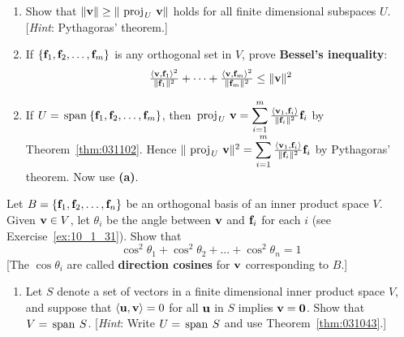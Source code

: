 \begin{multicols}{2}
\begin{ex}
\begin{enumerate}[label={\alph*.}]
\item Show that $\|\textbf{v}\| \geq \|\thinspace\operatorname{proj\medspace}_{\!U}\,{\textbf{v}}\|$ holds for all finite dimensional subspaces $U$. [\textit{Hint}: Pythagoras' theorem.]

\item If $\{\textbf{f}_{1}, \textbf{f}_{2}, \dots, \textbf{f}_{m}\}$ is any orthogonal set in $V$, prove \textbf{Bessel's inequality}:
\begin{equation*}
\tfrac{\langle \textbf{v}, \textbf{f}_1 \rangle ^2}{\| \textbf{f}_1 \| ^2} + \dots +
\tfrac{\langle \textbf{v}, \textbf{f}_m \rangle ^2}{\| \textbf{f}_m \| ^2}
\leq \| \textbf{v} \| ^2
\end{equation*}
\end{enumerate}
\begin{sol}
\begin{enumerate}[label={\alph*.}]
\setcounter{enumi}{1}
\item  If $U = \thinspace\operatorname{span\medspace}\{\textbf{f}_{1}, \textbf{f}_{2}, \dots, \textbf{f}_{m}\}$, then 
$\thinspace\operatorname{proj\medspace}_{\!U}\,{\textbf{v}} = \displaystyle \sum_{i = 1}^{m} \tfrac{\langle \textbf{v}_1, \textbf{f}_i \rangle}{\| \textbf{f}_i \| ^2} \textbf{f}_i$
 by Theorem~\ref{thm:031102}. Hence
$\| \thinspace\operatorname{proj\medspace}_{\!U}\,{\textbf{v}} \| ^2 =
\displaystyle \sum_{i = 1}^{m} \tfrac{\langle \textbf{v}_1, \textbf{f}_i \rangle}{\| \textbf{f}_i \| ^2} \textbf{f}_i$
 by Pythagoras' theorem. Now use \textbf{(a)}.

\end{enumerate}
\end{sol}
\end{ex}

\begin{ex}
Let $B = \{\textbf{f}_{1}, \textbf{f}_{2}, \dots, \textbf{f}_{n}\}$ be an orthogonal basis of an inner product space $V$. Given $\textbf{v} \in V$, let $\theta_{i}$ be the angle between $\textbf{v}$ and $\textbf{f}_{i}$ for each $i$ (see Exercise~\ref{ex:10_1_31}). Show that 
\begin{equation*}
\cos^{2} \theta_{1} + \cos^{2} \theta_{2} + \dots + \cos^{2} \theta_{n} = 1
\end{equation*}
 [The $\cos \theta_{i}$ are called \textbf{direction cosines} for $\textbf{v}$ corresponding to $B$.]
\end{ex}


\columnbreak
\begin{ex}
\begin{enumerate}[label={\alph*.}]
\item Let $S$ denote a set of vectors in a finite dimensional inner product space $V$, and suppose that $\langle\textbf{u}, \textbf{v}\rangle = 0$ for all $\textbf{u}$ in $S$ implies $\textbf{v} = \textbf{0}$. Show that $V = \thinspace\operatorname{span\medspace} S$. [\textit{Hint}: Write $U = \thinspace\operatorname{span\medspace} S$ and use Theorem~\ref{thm:031043}.]


\end{enumerate}
\end{ex}
\end{multicols}
